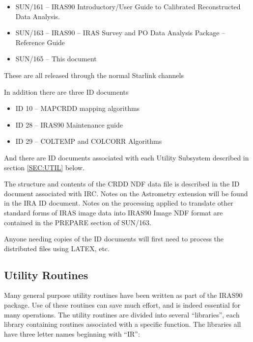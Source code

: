 \documentclass[twoside,11pt]{article}
\newcommand{\xref}[3]{#1}
\newcommand{\xlabel}[1]{}
\begin{document}
\begin{itemize}

\item \xref{SUN/161}{sun161}{} --
IRAS90 Introductory/User Guide to Calibrated Reconstructed Data Analysis.
 
\item \xref{SUN/163}{sun163}{} --
IRAS90 -- IRAS Survey and PO Data Analysis Package -- Reference Guide

\item \xref{SUN/165}{sun165}{} -- This document

\end{itemize}

These are all released through the normal Starlink channels

In addition there are three ID documents

\begin{itemize}

\item ID 10 -- MAPCRDD mapping algorithms
 
\item ID 28 -- IRAS90 Maintenance guide

\item ID 29 -- COLTEMP and COLCORR Algorithms

\end{itemize}

And there are ID documents associated with each Utility Subsystem described in
section \ref{SEC:UTIL} below.

The structure and contents of the CRDD NDF data file is described in the ID
document associated with IRC. Notes on the Astrometry extension will be found
in the IRA ID document. Notes on the processing applied to translate other 
standard forms of IRAS image data into IRAS90 Image NDF format are contained
in the PREPARE section of \xref{SUN/163}{sun163}{}.

Anyone needing copies of the ID documents will first need to process the 
distributed files using {\small LATEX}, etc. 


\subsection{Utility Routines
\xlabel{utility_routines}\label{SEC:UTIL}}

Many general purpose utility routines have been written as part of the
{\small IRAS90} package. Use of these routines can save much effort,
and is indeed essential for many operations. The utility routines are
divided into several ``libraries'', each library containing routines
associated with a specific function. The libraries all have three
letter names beginning with ``IR'':
\end{document}
